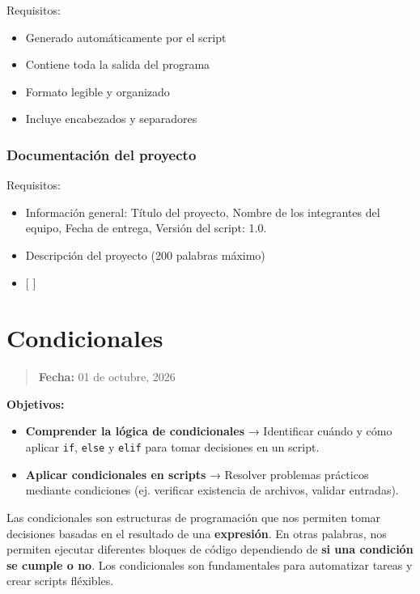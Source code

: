 \documentclass[
  spanish,
  12pt,
  letterpaper,
  DIV=11,
  numbers=noendperiod]{scrreprt}
\providecommand{\tightlist}{%
  \setlength{\itemsep}{0pt}\setlength{\parskip}{0pt}}
\begin{document}
Requisitos:

\begin{itemize}
\tightlist
\item[$\square$]
  Generado automáticamente por el script
\item[$\square$]
  Contiene toda la salida del programa
\item[$\square$]
  Formato legible y organizado
\item[$\square$]
  Incluye encabezados y separadores
\end{itemize}

\subsection{Documentación del
proyecto}\label{documentaciuxf3n-del-proyecto}

Requisitos:

\begin{itemize}
\tightlist
\item[$\square$]
  Información general: Título del proyecto, Nombre de los integrantes
  del equipo, Fecha de entrega, Versión del script: 1.0.
\item[$\square$]
  Descripción del proyecto (200 palabras máximo)
\item
  {[} {]}
\end{itemize}

\chapter{Condicionales}\label{condicionales}

\begin{quote}
\textbf{Fecha:} 01 de octubre, 2026
\end{quote}

\textbf{Objetivos:}

\begin{itemize}
\item
  \textbf{Comprender la lógica de condicionales} → Identificar cuándo y
  cómo aplicar \texttt{if}, \texttt{else} y \texttt{elif} para tomar
  decisiones en un script.
\item
  \textbf{Aplicar condicionales en scripts} → Resolver problemas
  prácticos mediante condiciones (ej. verificar existencia de archivos,
  validar entradas).
\end{itemize}

Las condicionales son estructuras de programación que nos permiten tomar
decisiones basadas en el resultado de una \textbf{expresión}. En otras
palabras, nos permiten ejecutar diferentes bloques de código dependiendo
de \textbf{si una condición se cumple o no}. Los condicionales son
fundamentales para automatizar tareas y crear scripts fléxibles.
\end{document}
